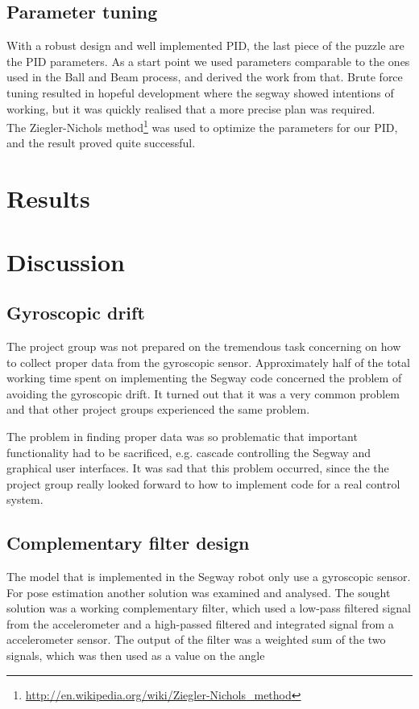 \subsection{Parameter tuning}
With a robust design and well implemented PID, the last piece of the puzzle are the PID parameters. As a start point we used parameters comparable to the ones used in the Ball and Beam process, and derived the work from that. Brute force tuning resulted in hopeful development where the segway showed intentions of working, but it was quickly realised that a more precise plan was required.
\\[3ex]
The Ziegler-Nichols method\footnote{\url{http://en.wikipedia.org/wiki/Ziegler-Nichols_method}} was used to optimize the parameters for our PID, and the result proved quite successful. 

\section{Results}

\section{Discussion}

\subsection{Gyroscopic drift}
The project group was not prepared on the tremendous task concerning on how to collect proper data from the gyroscopic sensor. Approximately half of the total working time spent on implementing the Segway code concerned the problem of avoiding the gyroscopic drift. 
It turned out that it was a very common problem and that other project groups experienced the same problem. 

\noindent The problem in finding proper data was so problematic that important functionality had to be sacrificed, e.g. cascade controlling the Segway and graphical user interfaces. It was sad that this problem occurred, since the the project group really looked forward to how to implement code for a real control system. 

\subsection{Complementary filter design}
The model that is implemented in the Segway robot only use a gyroscopic sensor. For pose estimation another solution was examined and analysed. The sought solution was a working complementary filter, which used a low-pass filtered signal from the accelerometer and a high-passed filtered and integrated signal from a accelerometer sensor. The output of the filter was a weighted sum of the two signals, which was then used as a value on the angle 
 
